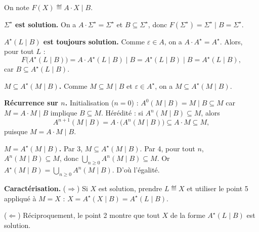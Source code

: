 \begin{corrections}

  On note $F(X) \eqdef A\cdot X \mid B$.

  \begin{questions}

  \item \textbf{$\Sigma^\star$ est solution.}
    On a $A\cdot \Sigma^\star = \Sigma^\star$ et $B \subseteq \Sigma^\star$, donc
    $F(\Sigma^\star) = \Sigma^\star \mid B = \Sigma^\star$.

  \item \textbf{$A^\star(L \mid B)$ est toujours solution.}
    Comme $\varepsilon \in A$, on a $A\cdot A^\star = A^\star$.
    Alors, pour tout $L$ :
    \[
    F\big(A^\star(L \mid B)\big) 
    = A\cdot A^\star(L \mid B) \mid B
    = A^\star(L \mid B) \mid B
    = A^\star(L \mid B),
    \]
    car $B \subseteq A^\star(L \mid B)$.

  \item \textbf{$M \subseteq A^\star(M \mid B)$.}
    Comme $M \subseteq M \mid B$ et $\varepsilon \in A^\star$, on a $M \subseteq A^\star(M \mid B)$.

  \item \textbf{Récurrence sur $n$.}
    Initialisation ($n=0$) : $A^0(M \mid B) = M \mid B \subseteq M$ car $M = A\cdot M \mid B$ implique $B \subseteq M$.
    Hérédité : si $A^n(M \mid B) \subseteq M$, alors
    \[
    A^{n+1}(M \mid B) = A \cdot \big(A^n(M \mid B)\big) \subseteq A \cdot M \subseteq M,
    \]
    puisque $M = A\cdot M \mid B$.

  \item \textbf{$M = A^\star(M \mid B)$.}
    Par 3, $M \subseteq A^\star(M \mid B)$.
    Par 4, pour tout $n$, $A^n(M \mid B) \subseteq M$, donc $\bigcup_{n\ge 0} A^n(M \mid B) \subseteq M$.
    Or $A^\star(M \mid B)=\bigcup_{n\ge 0} A^n(M \mid B)$. D’où l’égalité.

  \item \textbf{Caractérisation.}
    ($\Rightarrow$) Si $X$ est solution, prendre $L \eqdef X$ et utiliser le point 5 appliqué à $M=X$ :
    $X = A^\star(X \mid B) = A^\star(L \mid B)$.

    ($\Leftarrow$) Réciproquement, le point 2 montre que tout $X$ de la forme $A^\star(L \mid B)$ est solution.

  \end{questions}

\end{corrections}

\endgroup
\endinput
